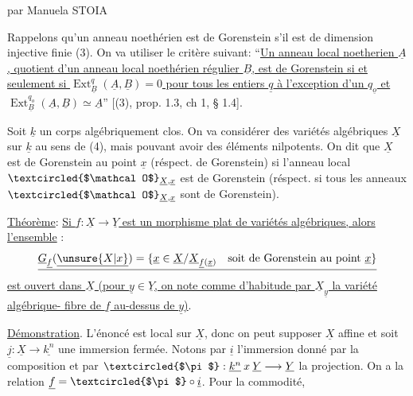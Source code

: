 \begin{center}

par Manuela STOIA
\end{center}

Rappelons qu'un anneau noethérien est de Gorenstein s'il est de dimension injective finie (3). On va utiliser le critère suivant: ``\uline{Un anneau local noetherien $\underline A$, quotient d'un anneau local noethérien régulier $\underline B$, est de Gorenstein si et seulement si $\operatorname{Ext}^{q}_{\underline B}(\underline A,\underline B)=0$ pour tous les entiers $\underline q$ à l'exception d'un $q_{\underline o}$ et $\operatorname{Ext}^{q_o}_{\underline B}(\underline A,\underline B)\simeq\underline A$}'' [(3), prop. 1.3, ch 1, § 1.4].

Soit $\underline k$ un corps algébriquement clos. On va considérer des variétés algébriques $\underline X$ sur $\underline k$ au sens de (4), mais pouvant avoir des éléments nilpotents. On dit que $\underline X$ est de Gorenstein au point $\underline x$ (réspect. de Gorenstein) si l'anneau local $\textcircled{$\mathcal O$}_{\underline X,\underline x}$ est de Gorenstein (réspect. si tous les anneaux $\textcircled{$\mathcal O$}_{\underline X,\underline x}$ sont de Gorenstein).

\uline{Théorème}: \uline{Si $\underline f:\underline X\longrightarrow\underline Y$ est un morphisme plat de variétés algébriques, alors l'ensemble} :
\[
\underline{\underline G_{\underline f}(\underline{\unsure{X|x}})=\{\underline x\in\underline X/\underline X_{\underline f(\underline x)}\quad\text{soit de Gorenstein au point }\underline x\}}
\]
\uline{est ouvert dans $\underline X$ (pour $\underline y\in\underline Y$, on note comme d'habitude par $\underline X_{\underline y}$ la variété algébrique- fibre de $\underline f$ au-dessus de $\underline y$)}.

\uline{Démonstration}. L'énoncé est local sur $\underline X$, donc on peut supposer $\underline X$ affine et soit $\underline j:\underline X\longrightarrow\underline{k^n}$ une immersion fermée. Notons par $\underline i$ l'immersion donné par la composition
et par $\textcircled{$\pi$}:\underline{k^n}\mathbin{x}\underline Y\longrightarrow\underline Y$ la projection. On a la relation $\underline f=\textcircled{$\pi$}\circ\underline i$. Pour la commodité,
